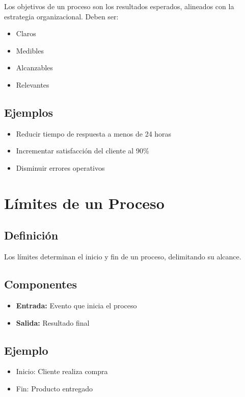 \documentclass[12pt,a4paper]{article}
\begin{document}
Los objetivos de un proceso son los resultados esperados, alineados con la estrategia organizacional. Deben ser:

\begin{itemize}
    \item Claros
    \item Medibles
    \item Alcanzables
    \item Relevantes
\end{itemize}

\subsection{Ejemplos}

\begin{itemize}
    \item Reducir tiempo de respuesta a menos de 24 horas
    \item Incrementar satisfacción del cliente al 90\%
    \item Disminuir errores operativos
\end{itemize}

\section{Límites de un Proceso}

\subsection{Definición}

Los límites determinan el inicio y fin de un proceso, delimitando su alcance.

\subsection{Componentes}

\begin{itemize}
    \item \textbf{Entrada:} Evento que inicia el proceso
    \item \textbf{Salida:} Resultado final
\end{itemize}

\subsection{Ejemplo}

\begin{itemize}
    \item Inicio: Cliente realiza compra
    \item Fin: Producto entregado
\end{itemize}
\end{document}
